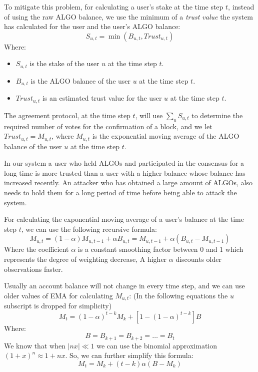 \documentclass[11pt, A4]{report}
\begin{document}
    To mitigate this problem, for calculating a user's stake at the time step \(t\), instead of using the raw ALGO
    balance, we use the minimum of a \emph{trust value} the system has calculated for the user and the user's
    ALGO balance:
    \[
        S_{u,t} = \min (B_{u,t}, Trust_{u,t})
    \]
    Where:
    \begin{itemize}
        \item \(S_{u,t}\) is the stake of the user \(u\) at the time step \(t\).
        \item \(B_{u,t}\) is the ALGO balance of the user \(u\) at the time step \(t\).
        \item \(Trust_{u,t}\) is an estimated trust value for the user \(u\) at the time step \(t\).
    \end{itemize}

    The agreement protocol, at the time step \(t\), will use \(\sum_{u}S_{u,t}\) to determine the required
    number of votes for the confirmation of a block, and we let \(Trust_{u,t} = M_{u,t}\), where \(M_{u,t}\) is the
    exponential moving average of the ALGO balance of the user \(u\) at the time step \(t\).

    In our system a user who held ALGOs and participated in the consensus for a long time is more trusted
    than a user with a higher balance whose balance has increased recently. An attacker who has obtained a large
    amount of ALGOs, also needs to hold them for a long period of time before being able to attack the system.

    For calculating the exponential moving average of a user's balance at the time step \(t\), we can use the following
    recursive formula:
    \[
        M_{u,t} = (1 - \alpha) M_{u,t-1} + \alpha B_{u,t} = M_{u,t-1} + \alpha (B_{u,t} - M_{u,t-1})
    \]
    Where the coefficient \(\alpha\) is a constant smoothing factor between \(0\) and \(1\) which represents the
    degree of
    weighting decrease, A higher \(\alpha\) discounts older observations faster.

    Usually an account balance will not change in every time step, and we can use older values of EMA for calculating
    \(M_{u,t}\): (In the following equations the \(u\) subscript is dropped for simplicity)
    \[
        M_{t} = (1 - \alpha)^{t-k}M_{k} + [1 - (1 - \alpha)^{t - k}]B
    \]
    Where:
    \[
        B = B_{k+1} = B_{k+2} = \dots = B_{t}
    \]
    We know that when \(|nx| \ll 1\) we can use the binomial approximation \({(1 + x)^n \approx 1 + nx}\). So, we can
    further simplify this formula:
    \[
        M_{t} = M_{k} + (t - k) \alpha (B - M_{k})
    \]
\end{document}
